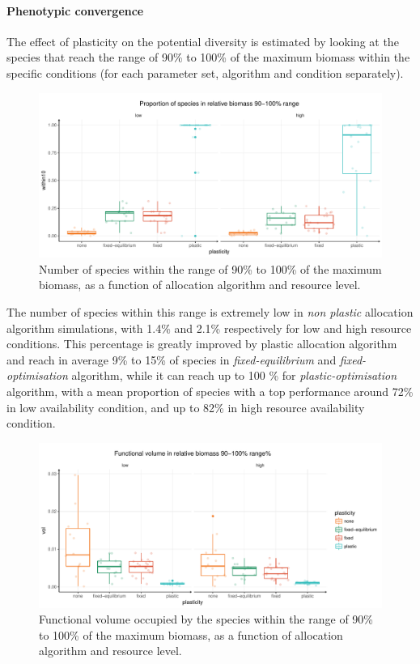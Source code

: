 \paragraph{Phenotypic convergence}

The effect of plasticity on the potential diversity is estimated by looking at the species that reach the range of 90\% to 100\% of the maximum biomass within the specific conditions (for each parameter set, algorithm and condition separately).

\begin{figure}\label{fig:species_richness}
\includegraphics[width = \textwidth]{./2_PP/Figures/Landscape/plot_eveness.pdf}
\caption{Number of species within the range of 90\% to 100\% of the maximum biomass, as a function of allocation algorithm and resource level.}
\end{figure}

The number of species within this range is extremely low in \textit{non plastic} allocation algorithm simulations, with 1.4\% and 2.1\% respectively for low and high resource conditions. This percentage is greatly improved by plastic allocation algorithm and reach in average 9\% to 15\% of species in \textit{fixed-equilibrium} and \textit{fixed-optimisation} algorithm, while it can reach up to 100 \% for \textit{plastic-optimisation} algorithm, with a mean proportion of species with a top performance around 72\% in low availability condition, and up to 82\% in high resource availability condition.

\begin{figure}\label{fig:function_div}
\includegraphics[width = \textwidth]{./2_PP/Figures/Landscape/plot_fdiv.pdf}
\caption{Functional volume occupied by the species within the range of 90\% to 100\% of the maximum biomass, as a function of allocation algorithm and resource level.}
\end{figure}

